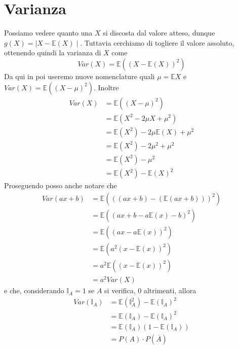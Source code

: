 \documentclass[11pt]{report}
\begin{document}
\section{Varianza}
Possiamo vedere quanto una $X$ si discosta dal valore atteso, dunque $g(X) = \mid X - \mathbb{E}(X) \mid$. Tuttavia cerchiamo di togliere il valore assoluto, ottenendo quindi la varianza di $X$ come
\begin{equation}
    Var(X) = \mathbb{E}((X - \mathbb{E}(X))^2)
\end{equation}
Da qui in poi useremo nuove nomenclature quali $\mu = \mathbb{E}X$ e $Var(X) = \mathbb{E}((X - \mu)^2)$. Inoltre
\begin{equation}
    \begin{split}
        Var(X) & = \mathbb{E}((X - \mu)^2)\\
        & = \mathbb{E}(X^2 - 2 \mu X + \mu^2)\\
        & = \mathbb{E}(X^2) - 2\mu\mathbb{E}(X) + \mu^2\\
        & = \mathbb{E}(X^2) - 2\mu^2 + \mu^2\\
        & = \mathbb{E}(X^2) - \mu^2\\
        & = \mathbb{E}(X^2) - \mathbb{E}(X)^2
    \end{split}
\end{equation}
Proseguendo posso anche notare che
\begin{equation}
    \begin{split}
        Var(ax + b) & = \mathbb{E}(((ax + b) - (\mathbb{E}(ax + b)))^2)\\
        & = \mathbb{E}((ax + b - a\mathbb{E}(x) - b)^2)\\
        & = \mathbb{E}((ax - a\mathbb{E}(x))^2)\\
        & = \mathbb{E}(a^2(x - \mathbb{E}(x))^2)\\
        & = a^2\mathbb{E}((x - \mathbb{E}(x))^2)\\
        & = a^2Var(X)
    \end{split}
\end{equation}
e che, considerando $\mathbb{I}_A = 1$ se $A$ si verifica, 0 altrimenti, allora
\begin{equation}
    \begin{split}
        Var(\mathbb{I}_A) & = \mathbb{E}(\mathbb{I}_A^2) - \mathbb{E}(\mathbb{I}_A)^2\\
        & = \mathbb{E}(\mathbb{I}_A) - \mathbb{E}(\mathbb{I}_A)^2\\
        & = \mathbb{E}(\mathbb{I}_A)(1 - \mathbb{E}(\mathbb{I}_A))\\
        & = P(A) \cdot P(\overline{A})
    \end{split}
\end{equation}
\end{document}
